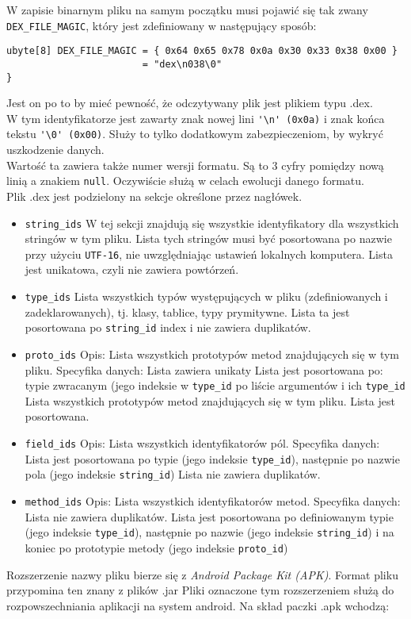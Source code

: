 \documentclass[12pt,a4paper,leqno,oneside,titlepage]{book}
\begin{document}
W zapisie binarnym pliku na samym początku musi pojawić się tak zwany \verb|DEX_FILE_MAGIC|, który jest zdefiniowany w następujący sposób:
\begin{lstlisting}
ubyte[8] DEX_FILE_MAGIC = { 0x64 0x65 0x78 0x0a 0x30 0x33 0x38 0x00 }
                        = "dex\n038\0"
}
\end{lstlisting}
Jest on po to by mieć pewność, że odczytywany plik jest plikiem typu .dex.\\
W tym identyfikatorze jest zawarty znak nowej lini \verb|'\n' (0x0a)| i znak końca tekstu \verb|'\0' (0x00)|. Służy to tylko dodatkowym zabezpieczeniom, by wykryć uszkodzenie danych.
\\
Wartość ta zawiera także numer wersji formatu. Są to 3 cyfry pomiędzy nową linią a znakiem \verb|null|. Oczywiście służą w celach ewolucji danego formatu.
\\
Plik .dex jest podzielony na sekcje określone przez nagłówek.
\begin{itemize}
\item\verb|string_ids|  W tej sekcji znajdują się wszystkie identyfikatory dla wszystkich stringów w tym pliku. Lista tych stringów musi być posortowana po nazwie przy użyciu \verb|UTF-16|, nie uwzględniając ustawień lokalnych komputera. Lista jest unikatowa, czyli nie zawiera powtórzeń.
\item\verb|type_ids| Lista wszystkich typów występujących w pliku (zdefiniowanych i zadeklarowanych), tj. klasy, tablice, typy prymitywne. Lista ta jest posortowana po \verb|string_id| index i nie zawiera duplikatów.
\item\verb|proto_ids|	
Opis:
	Lista wszystkich prototypów metod znajdujących się w tym pliku.
Specyfika danych:
	Lista zawiera unikaty
	Lista jest posortowana po:
		typie zwracanym (jego indeksie w \verb|type_id|
		po liście argumentów i ich \verb|type_id|\\
Lista wszystkich prototypów metod znajdujących się w tym pliku. Lista jest posortowana. 
\item\verb|field_ids|
Opis:
	Lista wszystkich identyfikatorów pól.	
Specyfika danych:
	Lista jest posortowana po typie (jego indeksie \verb|type_id|), następnie po nazwie pola (jego indeksie \verb|string_id|)
	Lista nie zawiera duplikatów.	
\item\verb|method_ids|
Opis:
	Lista wszystkich identyfikatorów metod.
Specyfika danych:
	Lista nie zawiera duplikatów.
	Lista jest posortowana po definiowanym typie (jego indeksie \verb|type_id|),
	następnie po nazwie (jego indeksie \verb|string_id|) i na koniec po prototypie metody (jego indeksie \verb|proto_id|)

\end{itemize}
Rozszerzenie nazwy pliku bierze się z \emph{Android Package Kit (APK)}.
Format pliku przypomina ten znany z plików .jar
Pliki oznaczone tym rozszerzeniem służą do rozpowszechniania aplikacji na system android. Na skład paczki .apk wchodzą:
\end{document}
